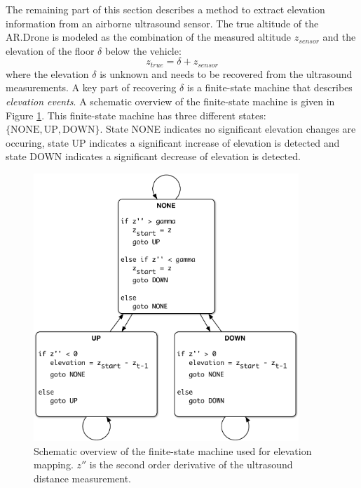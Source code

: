 The remaining part of this section describes a method to extract elevation information from an airborne ultrasound sensor.
The true altitude of the AR.Drone is modeled as the combination of the measured altitude $z_{sensor}$ and the elevation of the floor $\delta$ below the vehicle:
\begin{equation}
z_{true} = \delta + z_{sensor}
\end{equation}
where the elevation $\delta$ is unknown and needs to be recovered from the ultrasound measurements.
A key part of recovering $\delta$ is a finite-state machine that describes \textit{elevation events}.
A schematic overview of the finite-state machine is given in Figure \ref{fig:elevation_map_fsm}.
This finite-state machine has three different states: $\{ \text{NONE}, \text{UP}, \text{DOWN} \}$.
State NONE indicates no significant elevation changes are occuring, state UP indicates a significant increase of elevation is detected and state DOWN indicates a significant decrease of elevation is detected.

\begin{figure}[htb]
\centering
\includegraphics[width=10cm]{images/elevation_map_fsm.pdf}
\caption{Schematic overview of the finite-state machine used for elevation mapping. $z''$ is the second order derivative of the ultrasound distance measurement.}
\label{fig:elevation_map_fsm}
\end{figure}

